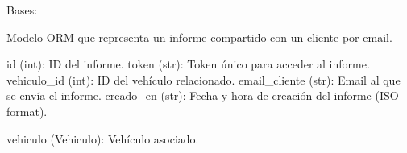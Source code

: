 \documentclass[letterpaper,10pt,spanish]{sphinxmanual}
\begin{document}
\begin{fulllineitems}
\label{\detokenize{modelos:main.InformeCompartido}}
\pysigstartsignatures
\pysiglinewithargsret
{}
{}
{}
\pysigstopsignatures
\sphinxAtStartPar
Bases: {\hyperref[\detokenize{modelos:main.Base}]{}}

\sphinxAtStartPar
Modelo ORM que representa un informe compartido con un cliente por email.
\begin{description}
\sphinxAtStartPar
id (int): ID del informe.
token (str): Token único para acceder al informe.
vehiculo\_id (int): ID del vehículo relacionado.
email\_cliente (str): Email al que se envía el informe.
creado\_en (str): Fecha y hora de creación del informe (ISO format).

\sphinxAtStartPar
vehiculo (Vehiculo): Vehículo asociado.

\end{description}

\end{fulllineitems}

\end{document}
